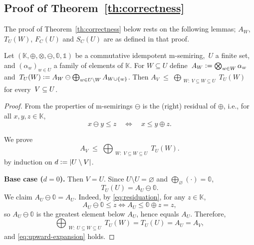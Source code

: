 \begin{toappendix}
\subsection{Proof of Theorem~\ref{th:correctness}}
The proof of Theorem~\ref{th:correctness} below rests on the following
lemmas; $A_W$, $T_U(W)$, $F_C(U)$ and $S_C(U)$ are as defined in that
proof.
\begin{lemma}\label{lem:upward-expansion}
Let $(\mathbb K,\oplus,\otimes,\ominus,\mathbb 0,\mathbb 1)$ be a
commutative idempotent m-semiring,~$U$ a finite set, and
$(\alpha_w)_{w\in U}$ a family of elements of $\mathbb K$. For
$W\subseteq U$ define~$A_W \mathrel{\mathop:}=\nobreak \bigotimes_{w\in W}\alpha_w$
and~$T_U(W) \mathrel{\mathop:}= A_W \ominus \bigoplus_{w\in U\setminus W} A_{W\cup\{w\}}$.
Then $A_V \;\le\; \bigoplus_{\substack{W:\;V\subseteq W\subseteq U}} T_U(W)$
for every~$V\subseteq\nobreak U$.
\end{lemma}

\begin{proof}
From the properties of m-semirings $\ominus$ is the (right) residual of $\oplus$, i.e., for all $x,y,z\in \mathbb K$,
\begin{equation}\label{eq:residuation}
  x\ominus y \le z \quad\Longleftrightarrow\quad x \le y\oplus z .
\end{equation}

We prove
\begin{equation}\label{eq:upward-expansion}
  A_V \;\le\; \bigoplus_{\substack{W:\;V\subseteq W\subseteq U}} T_U(W).
\end{equation}
by induction on $d\mathrel{\mathop:}=|U\setminus V|$.

\smallskip\noindent
\textbf{Base case ($d=0$).}
Then $V=U$. Since $U\setminus U=\varnothing$ and $\bigoplus_{\varnothing}(\cdot)=\mathbb 0$,
\[
  T_U(U)=A_U\ominus \mathbb 0.
\]
We claim $A_U\ominus\mathbb 0=A_U$. Indeed, by \eqref{eq:residuation}, for any $z\in \mathbb K$,
\[
  A_U\ominus\mathbb 0 \le z \iff A_U \le \mathbb 0\oplus z = z,
\]
so $A_U\ominus\mathbb 0$ is the greatest element below $A_U$, hence equals $A_U$.
Therefore,
\[
  \bigoplus_{\substack{W:\;U\subseteq W\subseteq U}} T_U(W)=T_U(U)=A_U=A_V,
\]
and \eqref{eq:upward-expansion} holds.


\end{proof}
\end{toappendix}
